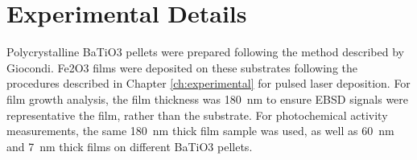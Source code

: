 \documentclass[12pt,%
              twoside,
               letterpaper]{uiothesis}
\begin{document}
\section{Experimental Details}
\label{sec:ch6experimental}


Polycrystalline BaTiO3 pellets were prepared following the 
method described by 
Giocondi.\cite{Giocondi:2003ub} Fe2O3 films were deposited on 
these substrates following the procedures described in Chapter 
\ref{ch:experimental} for pulsed laser deposition. For film growth 
analysis, the film thickness was \SI{180}{\nano\meter} to ensure EBSD 
signals were representative the film, rather than the substrate. For 
photochemical activity measurements, the same \SI{180}{\nano\meter} 
thick film sample was used, as well as \SI{60}{\nano\meter} and 
\SI{7}{\nano\meter} thick films on different BaTiO3 pellets.
\end{document}
